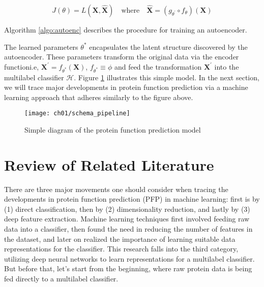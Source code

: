 \[
    J(\theta) = L(\mathbf{X}, \mathbf{\widehat{X}}) \quad \text{where} \quad
    \mathbf{\widehat{X}} = (g_{\theta^{\prime}} \circ f_{\theta}) (\mathbf{X})
\]

Algorithm \ref{algo:autoenc} describes the procedure for training an autoencoder.



The learned parameters $\theta^{\ast}$ encapsulates the latent structure
discovered by the autoencoder. These parameters transform the original data
via the encoder function\textemdash i.e, $ \mathbf{X}^{\prime} =
f_{\theta^{\ast}}(\mathbf{X})$, $f_{\theta^{\ast}} \equiv \phi$\textemdash
and feed the transformation $\mathbf{X}^{\prime}$ into the multilabel
classifier $\mathcal{H}$. Figure \ref{schema:pipeline} illustrates this
simple model. In the next section, we will trace major developments in
protein function prediction via a machine learning approach that adheres
similarly to the figure above.

\begin{figure}[!t]
  \centering
  \texttt{[image: ch01/schema\_pipeline]}
  \caption{Simple diagram of the protein function prediction model}
  \label{schema:pipeline}
\end{figure}

\section{Review of Related Literature}
\label{LiteratureReview}

\par There are three major movements one should consider when tracing the
developments in protein function prediction (PFP) in machine learning: first
is by (1) direct classification, then by (2) dimensionality reduction, and
lastly by (3) deep feature extraction. Machine learning techniques first
involved feeding raw data into a classifier, then found the need in reducing
the number of features in the dataset, and later on realized the importance
of learning suitable data representations for the classifier. This
research falls into the third category, utilizing deep neural networks to
learn representations for a multilabel classifier. But before that, let's
start from the beginning, where raw protein data is being fed directly to a
multilabel classifier.

